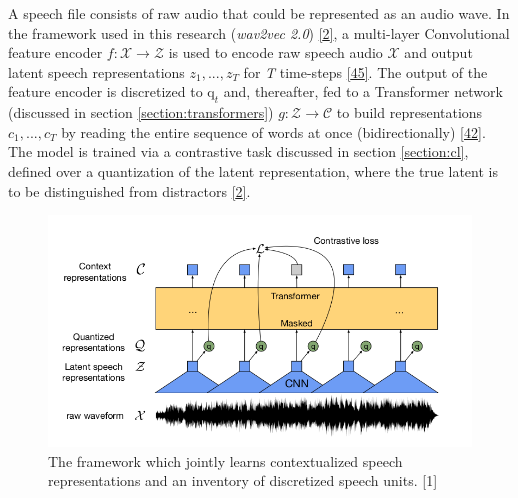 \documentclass[
  a4paper,
]{article}
\begin{document}
A speech file consists of raw audio that could be represented as an
audio wave. In the framework used in this research (\emph{wav2vec 2.0})
\protect\hyperlink{ref-2020arXiv200611477B}{{[}2{]}}, a multi-layer
Convolutional feature encoder \(f: \mathcal{X}\to\mathcal{Z}\) is used
to encode raw speech audio \(\mathcal{X}\) and output latent speech
representations \(z_1,...,z_T\) for \emph{T} time-steps
\protect\hyperlink{ref-jiang2019improving}{{[}45{]}}. The output of the
feature encoder is discretized to \(\mathrm{q}_t\) and, thereafter, fed
to a Transformer network (discussed in section
\ref{section:transformers}) \(g: \mathcal{Z}\to\mathcal{C}\) to build
representations \(c_1,...,c_T\) by reading the entire sequence of words
at once (bidirectionally)
\protect\hyperlink{ref-devlin2019bert}{{[}42{]}}. The model is trained
via a contrastive task discussed in section \ref{section:cl}, defined
over a quantization of the latent representation, where the true latent
is to be distinguished from distractors
\protect\hyperlink{ref-2020arXiv200611477B}{{[}2{]}}.

\begin{figure}

{\centering \includegraphics{framework2} 

}

\caption{The framework which jointly learns contextualized speech representations and an inventory of discretized speech units. [1]}\label{fig:framework}
\end{figure}
\end{document}
